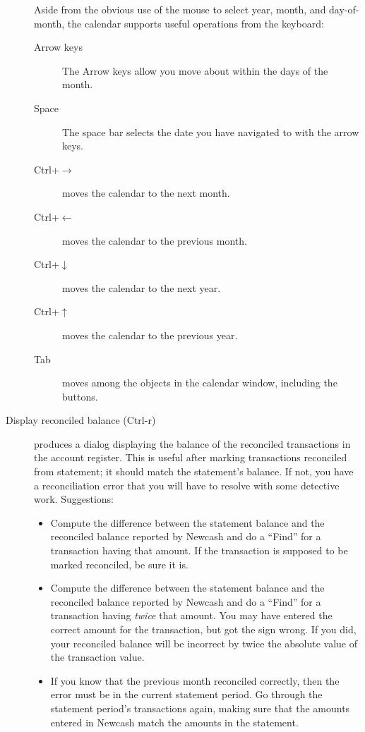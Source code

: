 \documentclass{report}
\begin{document}
\begin{description}
Aside from the obvious use of the mouse to select year, month, and day-of-month, the calendar supports useful operations from the keyboard:
\begin{description}
\item[Arrow keys] The Arrow keys allow you move about within the days of the month.
\item[Space] The space bar selects the date you have navigated to with the arrow keys.
\item[Ctrl+$\rightarrow$] moves the calendar to the next month.
\item[Ctrl+$\leftarrow$] moves the calendar to the previous month.
\item[Ctrl+$\downarrow$] moves the calendar to the next year.
\item[Ctrl+$\uparrow$] moves the calendar to the previous year.
\item[Tab] moves among the objects in the calendar window, including the buttons.
\end{description}
\item [Display reconciled balance (Ctrl-r)] produces a dialog displaying the balance of the reconciled transactions in the account register. This is useful after marking transactions reconciled from statement; it should match the statement's balance. If not, you have a reconciliation error that you will have to resolve with some detective work. Suggestions:
\begin{itemize}
\item Compute the difference between the statement balance and the reconciled balance reported by Newcash and do a ``Find'' for a transaction having that amount. If the transaction is supposed to be marked reconciled, be sure it is.
\item Compute the difference between the statement balance and the reconciled balance reported by Newcash and do a ``Find'' for a transaction having \emph{twice} that amount. You may have entered the correct amount for the transaction, but got the sign wrong. If you did, your reconciled balance will  be incorrect by twice the absolute value of the transaction value.
\item If you know that the previous month reconciled correctly, then the error must be in the current statement period. Go through the statement period's transactions again, making sure that the amounts entered in Newcash match the amounts in the statement.
\end{itemize}
\end{description}
\end{document}
